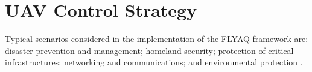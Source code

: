 \documentclass[letterpaper, 10 pt, conference]{ieeeconf}
\begin{document}
\section{UAV Control Strategy}\label{sec:UAVControl}
%
%
Typical scenarios considered in the implementation of the FLYAQ framework are: disaster prevention and management; homeland security; protection of critical infrastructures; networking and communications; and environmental protection  \cite{FlyAQ:2015}. 
%
%
%
\end{document}
